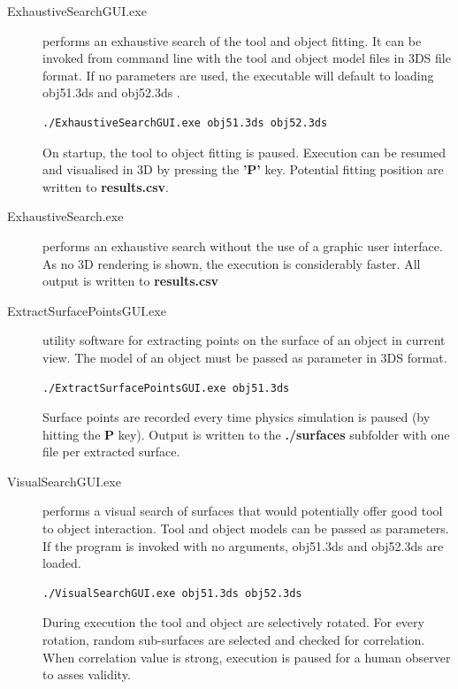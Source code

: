 \documentclass[11]{article}
\begin{document}
\begin{description}

  \item [ExhaustiveSearchGUI.exe] performs an exhaustive search of the tool and object fitting. It can be invoked from command line with the tool and object model files 	in 3DS file format. If no parameters are used, the executable will default to loading obj51.3ds and obj52.3ds .

    \begin{lstlisting}[language=bash]
  ./ExhaustiveSearchGUI.exe obj51.3ds obj52.3ds
    \end{lstlisting}

    On startup, the tool to object fitting is paused. Execution can be resumed and visualised in 3D by pressing the \textbf{'P'} key.
    Potential fitting position are written to \textbf{results.csv}.

  \item [ExhaustiveSearch.exe] performs an exhaustive search without the use of a graphic user interface. As no 3D rendering is shown, the execution is considerably faster. All output is written to \textbf{results.csv}

  \item [ExtractSurfacePointsGUI.exe] utility software for extracting points on the surface of an object in current view. The model of an object must be passed as parameter in 3DS format. 

    \begin{lstlisting}[language=bash]
  ./ExtractSurfacePointsGUI.exe obj51.3ds
    \end{lstlisting}

    Surface points are recorded every time physics simulation is paused (by hitting the \textbf{P} key).
    Output is written to the \textbf{./surfaces} subfolder with one file per extracted surface.   

  \item [VisualSearchGUI.exe] performs a visual search of surfaces that would potentially offer good tool to object interaction. Tool and object models can be passed as parameters. If the program is invoked with no arguments, obj51.3ds and obj52.3ds are loaded.
    
    \begin{lstlisting}[language=bash]
  ./VisualSearchGUI.exe obj51.3ds obj52.3ds
    \end{lstlisting}

    During execution the tool and object are selectively rotated. For every rotation, random sub-surfaces are selected and checked for correlation.
    When correlation value is strong, execution is paused for a human observer to asses validity. 

\end{description}

\printbibliography
\end{document}
